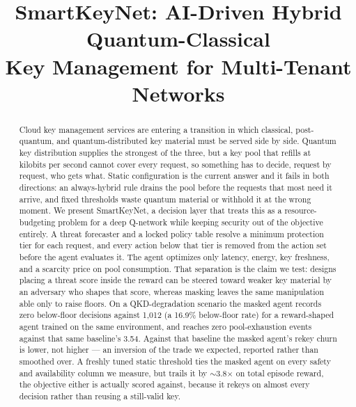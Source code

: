 \documentclass[conference]{IEEEtran}
\begin{document}
\title{SmartKeyNet: AI-Driven Hybrid Quantum-Classical\\ Key Management for Multi-Tenant Networks}

\author{
}

\maketitle

\begin{abstract}
Cloud key management services are entering a transition in which classical, post-quantum, and quantum-distributed
key material must be served side by side. Quantum key distribution supplies the strongest of the three, but a key pool
that refills at kilobits per second cannot cover every request, so
something has to decide, request by request, who gets what. Static
configuration is the current answer and it fails in both directions:
an always-hybrid rule drains the pool before the requests that
most need it arrive, and fixed thresholds waste quantum material
or withhold it at the wrong moment. We present SmartKeyNet,
a decision layer that treats this as a resource-budgeting problem
for a deep Q-network while keeping security out of the objective
entirely. A threat forecaster and a locked policy table resolve a
minimum protection tier for each request, and every action below
that tier is removed from the action set before the agent evaluates
it. The agent optimizes only latency, energy, key freshness, and
a scarcity price on pool consumption. That separation is the
claim we test: designs placing a threat score inside the reward
can be steered toward weaker key material by an adversary who
shapes that score, whereas masking leaves the same manipulation
able only to raise floors. On a QKD-degradation scenario the
masked agent records zero below-floor decisions against 1,012
(a 16.9\% below-floor rate) for a reward-shaped agent trained
on the same environment, and reaches zero pool-exhaustion
events against that same baseline's 3.54. Against that baseline
the masked agent's rekey churn is lower, not higher --- an
inversion of the trade we expected, reported rather than
smoothed over. A freshly tuned static threshold ties the masked
agent on every safety and availability column we measure, but
trails it by $\sim$3.8$\times$ on total episode reward, the objective
either is actually scored against, because it rekeys on almost
every decision rather than reusing a still-valid key.
\end{abstract}
\end{document}
